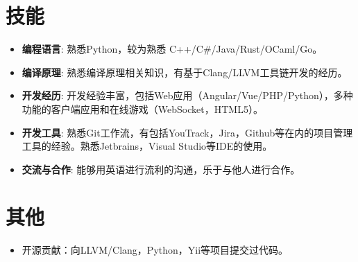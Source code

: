 \documentclass{resume}
\begin{document}
\section{技能}
\begin{itemize}[parsep=0.25ex]
  \item \textbf{编程语言}:
    熟悉Python，较为熟悉 C++/C\#/Java/Rust/OCaml/Go。

  \item \textbf{编译原理}:
    熟悉编译原理相关知识，有基于Clang/LLVM工具链开发的经历。
  
  \item \textbf{开发经历}:
    开发经验丰富，包括Web应用（Angular/Vue/PHP/Python），多种功能的客户端应用和在线游戏（WebSocket，HTML5）。
    
  \item \textbf{开发工具}:
    熟悉Git工作流，有包括YouTrack，Jira，Github等在内的项目管理工具的经验。熟悉Jetbrains，Visual Studio等IDE的使用。
  
%
 \item \textbf{交流与合作}:
    能够用英语进行流利的沟通，乐于与他人进行合作。
%
\end{itemize}

\section{其他}
\begin{itemize}[parsep=0.25ex]
  \item 开源贡献：向LLVM/Clang，Python，Yii等项目提交过代码。
\end{itemize}

%
%
\end{document}

